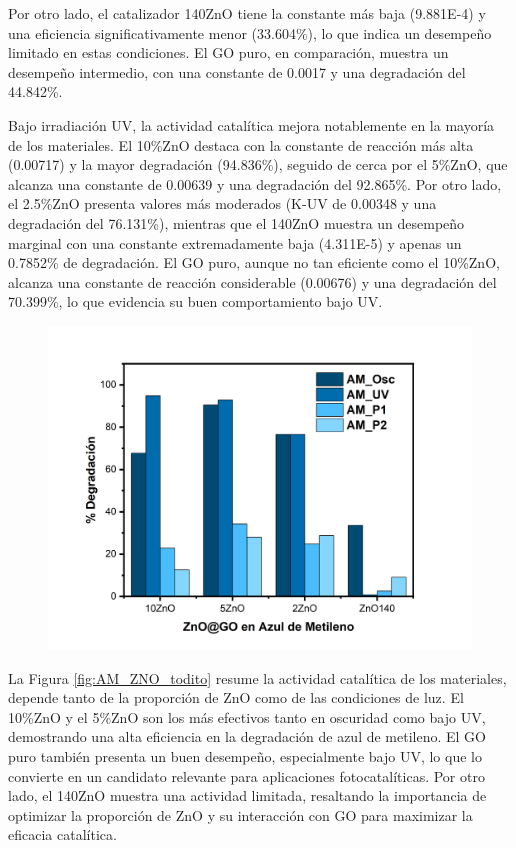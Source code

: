 \documentclass[12pt]{article}
\begin{document}
Por otro lado, el catalizador 140ZnO tiene la constante más baja (9.881E-4) y una eficiencia significativamente menor (33.604\%), lo que indica un desempeño limitado en estas condiciones. El GO puro, en comparación, muestra un desempeño intermedio, con una constante de 0.0017 y una degradación del 44.842\%.\vspace{1em} %

Bajo irradiación UV, la actividad catalítica mejora notablemente en la mayoría de los materiales. El 10\%ZnO destaca con la constante de reacción más alta (0.00717) y la mayor degradación (94.836\%), seguido de cerca por el 5\%ZnO, que alcanza una constante de 0.00639 y una degradación del 92.865\%. Por otro lado, el 2.5\%ZnO presenta valores más moderados (K-UV de 0.00348 y una degradación del 76.131\%), mientras que el 140ZnO muestra un desempeño marginal con una constante extremadamente baja (4.311E-5) y apenas un 0.7852\% de degradación. El GO puro, aunque no tan eficiente como el 10\%ZnO, alcanza una constante de reacción considerable (0.00676) y una degradación del 70.399\%, lo que evidencia su buen comportamiento bajo UV.
        
\begin{figure}[H]
    	   \begin{center}
     	  	\includegraphics[width = 1\textwidth]{Imagenes/AM_ZnO_4P.png}
    	   \end{center} 
        \end{figure}
La Figura \ref{fig:AM_ZNO_todito} resume la actividad catalítica de los materiales, depende tanto de la proporción de ZnO como de las condiciones de luz. El 10\%ZnO y el 5\%ZnO son los más efectivos tanto en oscuridad como bajo UV, demostrando una alta eficiencia en la degradación de azul de metileno. El GO puro también presenta un buen desempeño, especialmente bajo UV, lo que lo convierte en un candidato relevante para aplicaciones fotocatalíticas. Por otro lado, el 140ZnO muestra una actividad limitada, resaltando la importancia de optimizar la proporción de ZnO y su interacción con GO para maximizar la eficacia catalítica.\vspace{1em} %
\end{document}
